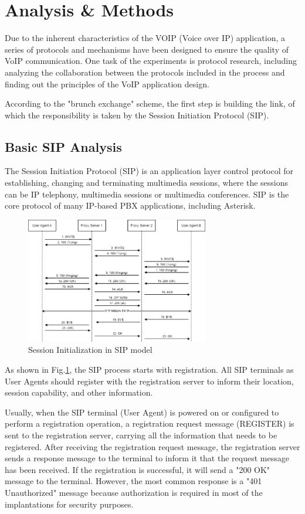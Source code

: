 \section{Analysis \& Methods}	\label{sec:analysis-methods}
Due to the inherent characteristics of the VOIP (Voice over IP) application, a series of protocols and mechanisms have been designed to ensure the quality of VoIP communication. One task of the experiments is protocol research, including analyzing the collaboration between the protocols included in the process and finding out the principles of the VoIP application design.

According to the "brunch exchange" scheme, the first step is building the link, of which the responsibility is taken by the Session Initiation Protocol (SIP).


\subsection{Basic SIP Analysis}
The Session Initiation Protocol (SIP) is an application layer control protocol for establishing, changing and terminating multimedia sessions, where the sessions can be IP telephony, multimedia sessions or multimedia conferences. SIP is the core protocol of many IP-based PBX applications, including Asterisk.

\begin{figure}[htbp]
	\centerline{\includegraphics[width=8cm]{Images/experiment/SIP.png}}
	\caption{Session Initialization in SIP model}
	\label{fig:sip}
\end{figure}



As shown in Fig.\ref{fig:sip}, the SIP process starts with registration. All SIP terminals as User Agents should register with the registration server to inform their location, session capability, and other information.

Usually, when the SIP terminal (User Agent) is powered on or configured to perform a registration operation, a registration request message (REGISTER) is sent to the registration server, carrying all the information that needs to be registered. After receiving the registration request message, the registration server sends a response message to the terminal to inform it that the request message has been received. If the registration is successful, it will send a "200 OK" message to the terminal. However, the most common response is a "401 Unauthorized" message because authorization is required in most of the implantations for security purposes. 

